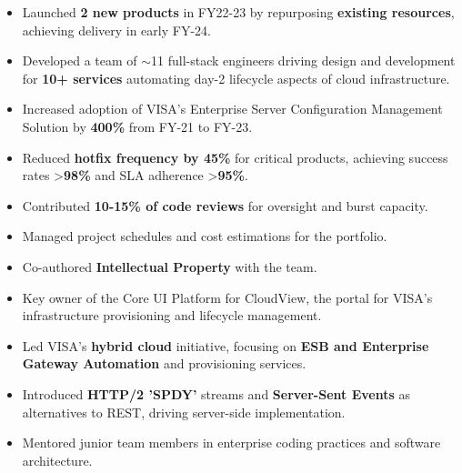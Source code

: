 \documentclass[10pt,a4paper,ragged2e,withhyper]{altacv}
\begin{document}
\begin{itemize}
  \item Launched \textbf{2 new products} in FY22-23 by repurposing \textbf{existing resources}, achieving delivery in early FY-24.
  \item Developed a team of \(\sim\)11 full-stack engineers driving design and development for \textbf{10+ services} automating day-2 lifecycle aspects of cloud infrastructure.
  \item Increased adoption of VISA's Enterprise Server Configuration Management Solution by \textbf{400\%} from FY-21 to FY-23.
  \item Reduced \textbf{hotfix frequency by 45\%} for critical products, achieving success rates >\textbf{98\%} and SLA adherence >\textbf{95\%}.
  \item Contributed \textbf{10-15\% of code reviews} for oversight and burst capacity.
  \item Managed project schedules and cost estimations for the portfolio.
  \item Co-authored \textbf{Intellectual Property} with the team.
\end{itemize}

\divider

\begin{itemize}
  \item Key owner of the Core UI Platform for CloudView, the portal for VISA’s infrastructure provisioning and lifecycle management.
  \item Led VISA’s \textbf{hybrid cloud} initiative, focusing on \textbf{ESB and Enterprise Gateway Automation} and provisioning services.
  \item Introduced \textbf{HTTP/2 'SPDY'} streams and \textbf{Server-Sent Events} as alternatives to REST, driving server-side implementation.
  \item Mentored junior team members in enterprise coding practices and software architecture.
\end{itemize}

\divider
\end{document}
